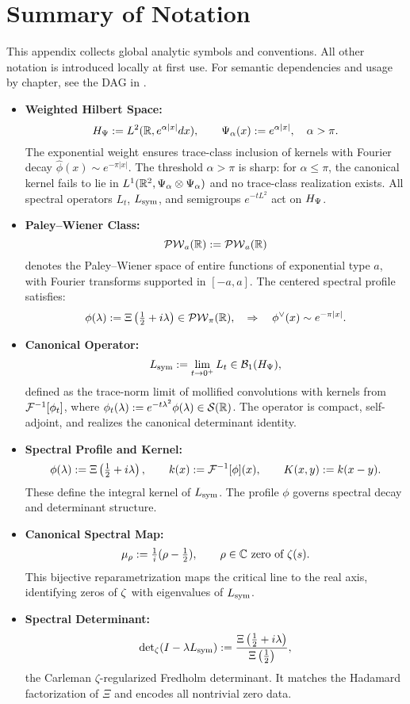 \section{Summary of Notation}
\label{app:notation_summary}

\noindent
This appendix collects global analytic symbols and conventions. All other notation is introduced locally at first use. For semantic dependencies and usage by chapter, see the DAG in .

\begin{itemize}
    \item \textbf{Weighted Hilbert Space:}
  \[
  H_{\Psi} := L^2(\mathbb{R}, e^{\alpha |x|} dx), \qquad \Psi_\alpha(x) := e^{\alpha |x|}, \quad \alpha > \pi.
  \]
  The exponential weight ensures trace-class inclusion of kernels with Fourier decay \( \widehat{\phi}(x) \sim e^{-\pi |x|} \). The threshold \( \alpha > \pi \) is sharp: for \( \alpha \le \pi \), the canonical kernel fails to lie in \( L^1(\mathbb{R}^2, \Psi_\alpha \otimes \Psi_\alpha) \) and no trace-class realization exists. All spectral operators \( L_t \), \( L_{\mathrm{sym}} \), and semigroups \( e^{-tL^2} \) act on \( H_{\Psi} \).

  \item \textbf{Paley–Wiener Class:}
  \[
  \mathcal{PW}_{a}(\mathbb{R}) := \mathcal{PW}_a(\mathbb{R})
  \]
  denotes the Paley–Wiener space of entire functions of exponential type \( a \), with Fourier transforms supported in \( [-a, a] \). The centered spectral profile satisfies:
  \[
  \phi(\lambda) := \Xi\left( \tfrac{1}{2} + i\lambda \right) \in \mathcal{PW}_{\pi}(\mathbb{R}), \quad \Rightarrow \quad \phi^\vee(x) \sim e^{-\pi |x|}.
  \]

  \item \textbf{Canonical Operator:}
  \[
  L_{\mathrm{sym}} := \lim_{t \to 0^+} L_t \in \mathcal{B}_1(H_{\Psi}),
  \]
  defined as the trace-norm limit of mollified convolutions with kernels from \( \mathcal{F}^{-1}[\phi_t] \), where \( \phi_t(\lambda) := e^{-t\lambda^2} \phi(\lambda) \in \mathcal{S}(\mathbb{R}) \). The operator is compact, self-adjoint, and realizes the canonical determinant identity.

  \item \textbf{Spectral Profile and Kernel:}
  \[
  \phi(\lambda) := \Xi\left( \tfrac{1}{2} + i\lambda \right), \qquad k(x) := \mathcal{F}^{-1}[\phi](x), \qquad K(x, y) := k(x - y).
  \]
  These define the integral kernel of \( L_{\mathrm{sym}} \). The profile \( \phi \) governs spectral decay and determinant structure.

  \item \textbf{Canonical Spectral Map:}
  \[
  \mu_\rho := \tfrac{1}{i}(\rho - \tfrac{1}{2}), \qquad \rho \in \mathbb{C} \text{ zero of } \zeta(s).
  \]
  This bijective reparametrization maps the critical line to the real axis, identifying zeros of \( \zeta \) with eigenvalues of \( L_{\mathrm{sym}} \).

  \item \textbf{Spectral Determinant:}
  \[
  \det\nolimits_{\zeta}(I - \lambda L_{\mathrm{sym}}) := \frac{\Xi\left( \tfrac{1}{2} + i\lambda \right)}{\Xi\left( \tfrac{1}{2} \right)},
  \]
  the Carleman \(\zeta\)-regularized Fredholm determinant. It matches the Hadamard factorization of \( \Xi \) and encodes all nontrivial zero data.
\end{itemize}

